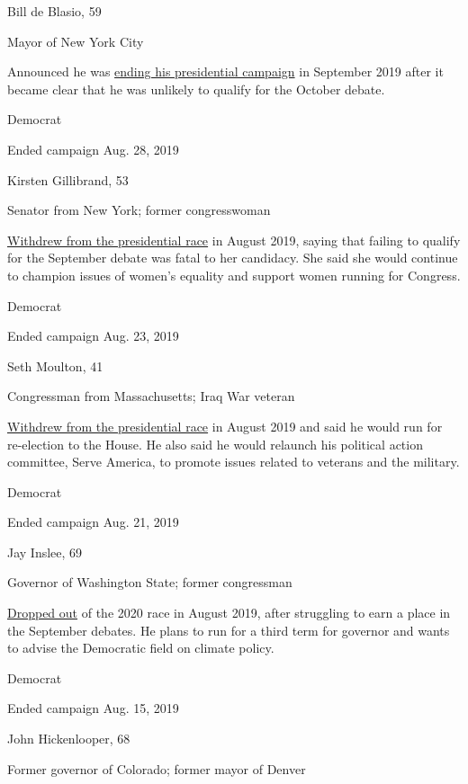 Bill de Blasio, 59

Mayor of New York City

Announced he was
\href{https://www.nytimes3xbfgragh.onion/2019/09/20/nyregion/de-blasio-2020-drops-out.html}{ending
his presidential campaign} in September 2019 after it became clear that
he was unlikely to qualify for the October debate.

Democrat

Ended campaign Aug. 28, 2019

Kirsten Gillibrand, 53

Senator from New York; former congresswoman

\href{https://www.nytimes3xbfgragh.onion/2019/08/28/us/politics/kirsten-gillibrand-2020-drop-out.html}{Withdrew
from the presidential race} in August 2019, saying that failing to
qualify for the September debate was fatal to her candidacy. She said
she would continue to champion issues of women's equality and support
women running for Congress.

Democrat

Ended campaign Aug. 23, 2019

Seth Moulton, 41

Congressman from Massachusetts; Iraq War veteran

\href{https://www.nytimes3xbfgragh.onion/2019/08/23/us/politics/seth-moulton-2020-drop-out.html}{Withdrew
from the presidential race} in August 2019 and said he would run for
re-election to the House. He also said he would relaunch his political
action committee, Serve America, to promote issues related to veterans
and the military.

Democrat

Ended campaign Aug. 21, 2019

Jay Inslee, 69

Governor of Washington State; former congressman

\href{https://www.nytimes3xbfgragh.onion/2019/08/21/us/politics/jay-inslee-2020-campaign.html?action=click\&module=Latest\&pgtype=Homepage}{Dropped
out} of the 2020 race in August 2019, after struggling to earn a place
in the September debates. He plans to run for a third term for governor
and wants to advise the Democratic field on climate policy.

Democrat

Ended campaign Aug. 15, 2019

John Hickenlooper, 68

Former governor of Colorado; former mayor of Denver

